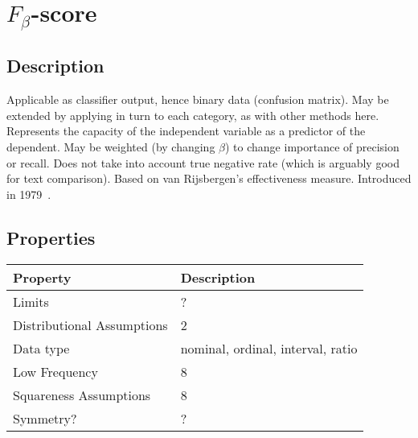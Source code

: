 \documentclass[11pt]{article}
\begin{document}
\section{$F_\beta$-score}
\label{section:fscore}
\subsection{Description}
Applicable as classifier output, hence binary data (confusion matrix).  
May be extended by applying in turn to each category, as with other methods here.  
Represents the capacity of the independent variable as a predictor of the dependent.  
May be weighted (by changing $\beta$) to change importance of precision or recall.  
Does not take into account true negative rate (which is arguably good for text comparison).
Based on van Rijsbergen's effectiveness measure.
Introduced in 1979~\cite{Rijsbergen1979IR539927}.


\subsection{Properties}
\begin{tabular}{| l || l |}
    \hline
    {\bf Property} & {\bf Description} \\
    \hline
    Limits & ? \\ \hline

    Distributional Assumptions& 2 \\ \hline

    Data type & nominal, ordinal, interval, ratio \\ \hline

    Low Frequency & 8 \\ \hline

    Squareness Assumptions & 8 \\ \hline
    
    Symmetry? & ? \\ \hline

\end{tabular}
\end{document}
